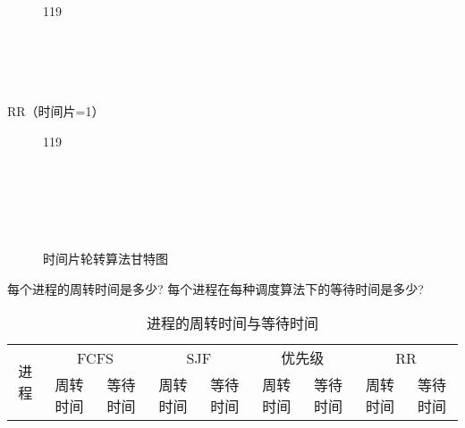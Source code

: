 \documentclass{ctexart}
\begin{document}
\begin{outline}[enumerate]
\begin{figure}[H]
\begin{os-gantt}[
                y unit = .5cm,
                bar height = 1
            ]{1}{19}
                 \\
                 \\
                 \\
                 \\
                 \\
            \end{os-gantt}
        \end{figure}
        \3 RR（时间片=1）
        \begin{figure}[H]
            \caption{时间片轮转算法甘特图}
            \centering
            \begin{os-gantt}[
                y unit = .5cm,
                bar height = 1
            ]{1}{19}
                 \\
                  
                  
                  \\
                 \\
                  
                  
                 \\
                 \\
                 \\
            \end{os-gantt}
        \end{figure}
    \2 每个进程的周转时间是多少?
    \2 每个进程在每种调度算法下的等待时间是多少?
    \begin{table}[H]
        \centering
        \caption{进程的周转时间与等待时间}
        \begin{tabular}{*{9}{c}}
          \toprule
          \multirow{2}{*}[-2pt]{进程} & \multicolumn{2}{c}{FCFS} & \multicolumn{2}{c}{SJF} 
            & \multicolumn{2}{c}{优先级} & \multicolumn{2}{c}{RR} \\
          \cmidrule(lr){2-3}
          \cmidrule(lr){4-5}
          \cmidrule(lr){6-7}
          \cmidrule(lr){8-9}
            & 周转时间 & 等待时间 & 周转时间 & 等待时间 & 周转时间 & 等待时间 & 周转时间 & 等待时间 \\

\end{tabular}
\end{table}
\end{outline}
\end{document}
